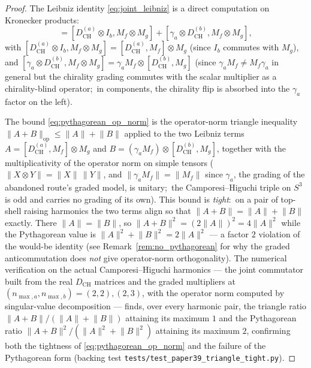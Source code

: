 \documentclass[11pt,a4paper]{article}
\theoremstyle{plain}
\theoremstyle{definition}
\newcommand{\nmaxa}{n_{\max,a}}
\newcommand{\nmaxb}{n_{\max,b}}
\newcommand{\sthree}{S^{3}}
\newcommand{\norm}[1]{\lVert #1 \rVert}
\newcommand{\Mat}{M}
\newcommand{\DCH}{D_{\mathrm{CH}}}
\begin{document}
\begin{proof}
The Leibniz identity \eqref{eq:joint_leibniz} is a direct computation
on Kronecker products:
\begin{equation*}
[D_{a,b}, \Mat_f \otimes \Mat_g]
= [\DCH^{(a)} \otimes I_b, \Mat_f \otimes \Mat_g]
 + [\gamma_a \otimes \DCH^{(b)}, \Mat_f \otimes \Mat_g],
\end{equation*}
with $[\DCH^{(a)} \otimes I_b, \Mat_f \otimes \Mat_g] = [\DCH^{(a)},
\Mat_f] \otimes \Mat_g$ (since $I_b$ commutes with $\Mat_g$), and
$[\gamma_a \otimes \DCH^{(b)}, \Mat_f \otimes \Mat_g] = \gamma_a
\Mat_f \otimes [\DCH^{(b)}, \Mat_g]$ (since $\gamma_a \Mat_f \ne
\Mat_f \gamma_a$ in general but the chirality grading commutes with
the scalar multiplier as a chirality-blind operator;\ in components,
the chirality flip is absorbed into the $\gamma_a$ factor on the left).

The bound \eqref{eq:pythagorean_op_norm} is the operator-norm triangle
inequality $\norm{A + B}_{\mathrm{op}} \le \norm{A} + \norm{B}$ applied
to the two Leibniz terms $A = [\DCH^{(a)}, \Mat_f] \otimes \Mat_g$ and
$B = (\gamma_a \Mat_f) \otimes [\DCH^{(b)}, \Mat_g]$, together with the
multiplicativity of the operator norm on simple tensors
($\norm{X \otimes Y} = \norm{X}\,\norm{Y}$, and $\norm{\gamma_a \Mat_f}
= \norm{\Mat_f}$ since $\gamma_a$, the grading of the abandoned route's
graded model, is unitary;\ the Camporesi--Higuchi triple on $\sthree$ is
odd and carries no grading of its own). This bound is
\emph{tight}:\ on a pair of top-shell raising harmonics the two terms
align so that $\norm{A + B} = \norm{A} + \norm{B}$ exactly. There
$\norm{A} = \norm{B}$, so $\norm{A+B}^2 = (2\norm{A})^2 = 4\norm{A}^2$
while the Pythagorean value is $\norm{A}^2 + \norm{B}^2 = 2\norm{A}^2$
--- a factor $2$ violation of the would-be identity (see
Remark~\ref{rem:no_pythagorean} for why the
graded anticommutation does \emph{not} give operator-norm
orthogonality). The numerical verification on the actual
Camporesi--Higuchi harmonics --- the joint commutator built from the
real $\DCH$ matrices and the graded multipliers at
$(\nmaxa, \nmaxb) = (2,2), (2,3)$, with the operator norm computed by
singular-value decomposition --- finds, over every harmonic pair, the
triangle ratio $\norm{A+B}/(\norm{A}+\norm{B})$ attaining its maximum
$1$ and the Pythagorean ratio $\norm{A+B}^2/(\norm{A}^2+\norm{B}^2)$
attaining its maximum $2$, confirming both the tightness of
\eqref{eq:pythagorean_op_norm} and the failure of the Pythagorean form
(backing test \texttt{tests/test\_paper39\_triangle\_tight.py}).


\end{proof}
\end{document}
